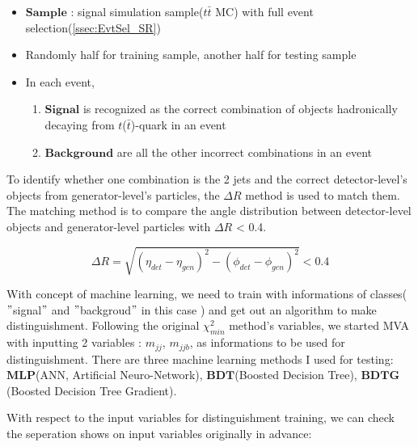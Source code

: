 			\begin{itemize}

				\item $\textbf{Sample}$ : signal simulation sample($t\bar{t}$ MC) with full event selection(\ref{ssec:EvtSel_SR})
				\item Randomly half for training sample, another half for testing sample
				\item In each event,
				\begin{enumerate}
					\item $\textbf{Signal}$ is recognized as the correct combination of objects hadronically decaying from $t$($\bar{t}$)-quark in an event
					\item $\textbf{Background}$ are all the other incorrect combinations in an event
				\end{enumerate}
			\end{itemize}

			To identify whether one combination is the 2 jets and the correct detector-level's objects from generator-level's particles, the $\Delta R$ method is used to match them. The matching method is to compare the angle distribution between detector-level objects and generator-level particles with $\Delta R$ < 0.4. 
			
			\begin{equation}
			\Delta R = \sqrt{ (\eta_{det} - \eta_{gen})^2 - (\phi_{det} - \phi_{gen})^2 } < 0.4
			\label{eq:gen_matching}
			\end{equation}
		
			With concept of machine learning, we need to train with informations of classes( $"$signal$"$ and $"$backgroud$"$ in this case ) and get out an algorithm to make distinguishment. Following the original $\chi^2_{min}$ method's variables, we started MVA with inputting 2 variables : $m_{jj}$, $m_{jjb}$, as informations to be used for distinguishment. There are three machine learning methods I used for testing: $\textbf{MLP}$(ANN, Artificial Neuro-Network), $\textbf{BDT}$(Boosted Decision Tree), $\textbf{BDTG}$(Boosted Decision Tree Gradient).

			With respect to the input variables for distinguishment training, we can check the seperation shows on input variables originally in advance:


